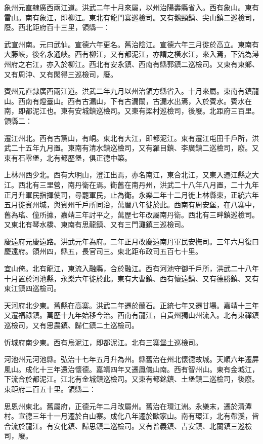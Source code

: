 象州元直隸廣西兩江道。洪武二年十月來屬，以州治陽壽縣省入。西有象山。東有雷山。南有象江，即柳江。東北有龍門寨巡檢司。又有鵝頸鎮、尖山鎮二巡檢司，廢。西北距府百十三里，領縣一：

武宣州南。元曰武仙。宣德六年更名。舊治陰江。宣德六年三月徙於高立。東南有大藤峽，後名永通峽。西有柳江，又有都泥江，亦謂之橫水江，來入焉，下流為潯州府之右江，亦入於柳江。西北有安永鎮、西南有縣郭鎮二巡檢司。又東有東鄉、又有周沖、又有閑得三巡檢司，廢。

賓州元直隸廣西兩江道。洪武二年九月以州治領方縣省入。十月來屬。東南有鎮龍山。西南有燈臺山。西有古漏山，下有古漏關，古漏水出焉，入於賓水。賓水在南，即都泥江也。東有安城鎮巡檢司。又東有梁村巡檢司，後廢。北距府三百里。領縣二：

遷江州北。西有古黨山，有峒。東北有大江，即都泥江。東有遷江屯田千戶所，洪武二十五年九月置。東南有清水鎮巡檢司，又有羅目鎮、李廣鎮二巡檢司，廢。又東有石零堡，北有都歷堡，俱正德中築。

上林州西少北。西有大明山，澄江出焉，亦名南江，東合北江，又東入遷江縣之大江。西北有三里營，南丹衛在焉。衛舊在南丹州，洪武二十八年八月置，二十九年正月升軍民指揮使司，尋罷軍民，止為衛。永樂二年十二月徙上林縣東，正統六年五月徙賓州城，與賓州千戶所同治，萬曆八年徙於此。西南有周安堡，在八寨中，舊為瑤、僮所據，嘉靖三年討平之，萬歷七年改屬南丹衛。西北有三畔鎮巡檢司。又東北有琴水橋、東南有思龍鎮、又有三門灘鎮三巡檢司。

慶遠府元慶遠路。洪武元年為府。二年正月改慶遠南丹軍民安撫司。三年六月復曰慶遠府。領州四，縣五，長官司三。東北距布政司五百七十里。

宜山倚。北有龍江，東流入融縣，合於融江。西有河池守御千戶所，洪武二十八年十月置於河池縣，永樂六年徙於此。東有大曹鎮、西有懷遠鎮、又有德勝鎮、又有東江鎮四巡檢司。

天河府北少東。舊縣在高寨。洪武二年遷於蘭石。正統七年又遷甘場。嘉靖十三年又遷福祿鎮。萬歷十九年始移今治。西南有龍江，自貴州獨山州流入。北有東禪鎮巡檢司，又有思農鎮、歸仁鎮二土巡檢司。

忻城府南少東。西有烏泥江，即都泥江。北有三寨堡土巡檢司。

河池州元河池縣。弘治十七年五月升為州。縣舊治在州北懷德故城。天順六年遷屏風山。成化十三年還治懷德。嘉靖四年又遷鳳儀山南。西有智州山。東有金城江，下流合於都泥江。江北有金城鎮巡檢司。又東有都銘鎮、土堡鎮二巡檢司，後廢。東距府二百五十里。領縣二：

思恩州東北。舊屬府，正德元年二月改屬州。舊治在環江洲。永樂末，遷於清潭村。宣德三年十一月遷於白山寨。成化八年遷於歐家山。南有環江，北有帶溪，皆合流於龍江。有安化鎮、歸思鎮二巡檢司。又有普義鎮、吉安鎮、北蘭鎮三巡檢司，廢。

